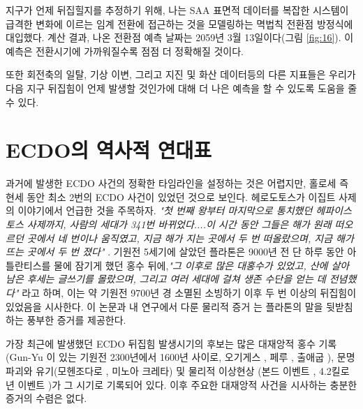\documentclass[10pt,twocolumn,letterpaper]{article}
\begin{document}
지구가 언제 뒤집힐지를 추정하기 위해, 나는 SAA 표면적 데이터를 복잡한 시스템이 급격한 변화에 이르는 임계 전환에 접근하는 것을 모델링하는 멱법칙 전환점 방정식에 대입했다. 계산 결과, 나온 전환점 예측 날짜는 2059년 3월 13일이다(그림 \ref{fig:16}). 이 예측은 전환시기에 가까워질수록 점점 더 정확해질 것이다\cite{136}.

또한 회전축의 일탈, 기상 이변, 그리고 지진 및 화산 데이터등의 다른 지표들은 우리가 다음 지구 뒤집힘이 언제 발생할 것인가에 대해 더 나은 예측을 할 수 있도록 도움을 줄 수 있다.

\section{ECDO의 역사적 연대표}

과거에 발생한  ECDO 사건의 정확한 타임라인을 설정하는 것은 어렵지만, 홀로세 즉 현세 동안 최소 2번의 ECDO 사건이 있었던 것으로 보인다. 헤로도토스가 이집트 사제의 이야기에서 언급한 것을 주목하자. \textit{"첫 번째 왕부터 마지막으로 통치했던 헤파이스토스 사제까지, 사람의 세대가 341번 바뀌었다....이 시간 동안 그들은 해가 원래 떠오르던 곳에서 네 번이나 움직였고, 지금 해가 지는 곳에서 두 번 떠올랐으며, 지금 해가 뜨는 곳에서 두 번 졌다"} \cite{32}. 기원전 5세기에 살았던 플라톤은 9000년 전 단 하루 동안 아틀란티스를 물에 잠기게 했던 홍수 뒤에,\textit{"그 이후로 많은 대홍수가 있었고, 산에 살아남은 후세는 글쓰기를 몰랐으며, 그리고  여러 세대에 걸쳐 생존 수단을 얻는 데 전념했다"} \cite{112}라고 하며, 이는 약 기원전 9700년 경 소멸된 소빙하기 이후 두 번 이상의 뒤집힘이 있었음을 시사한다. 이 논문과 내 연구에서 다룬 물리적 증거 \cite{2}는 플라톤의 말을 뒷받침하는 풍부한 증거를 제공한다.

가장 최근에 발생했던 ECDO 뒤집힘 발생시기의 후보는  많은 대재앙적 홍수 기록(Gun-Yu \cite{113,114,115}이 있는 기원전 2300년에서 1600년 사이로, 오기게스 \cite{116,117}, 페루 \cite{118,119}, 출애굽 \cite{120}), 문명 파괴와 유기(모헨조다로 \cite{121}, 미노아 크레타\cite{100,101}) 및 물리적 이상현상 (본드 이벤트 \cite{122}, 4.2킬로년 이벤트 \cite{90})가 그 시기로 기록되어 있다. 이후 주요한 대재앙적 사건을 시사하는 충분한 증거의 수렴은 없다.
\end{document}
